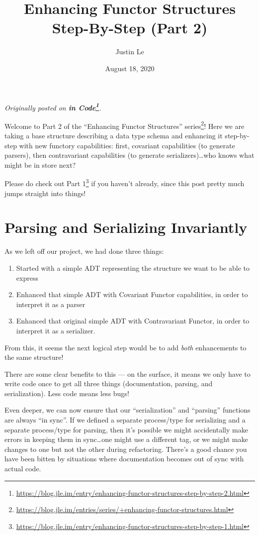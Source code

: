 \documentclass[]{article}
\title{Enhancing Functor Structures Step-By-Step (Part 2)}
\author{Justin Le}
\date{August 18, 2020}
\renewcommand{\href}[2]{#2\footnote{\url{#1}}}
\begin{document}
\maketitle

\emph{Originally posted on
\textbf{\href{https://blog.jle.im/entry/enhancing-functor-structures-step-by-step-2.html}{in
Code}}.}

Welcome to Part 2 of the
\href{https://blog.jle.im/entries/series/+enhancing-functor-structures.html}{``Enhancing
Functor Structures'' series}! Here we are taking a base structure describing a
data type schema and enhancing it step-by-step with new functory capabilities:
first, covariant capabilities (to generate parsers), then contravariant
capabilities (to generate serializers)\ldots who knows what might be in store
next?

Please do check out
\href{https://blog.jle.im/entry/enhancing-functor-structures-step-by-step-1.html}{Part
1} if you haven't already, since this post pretty much jumps straight into
things!

\hypertarget{parsing-and-serializing-invariantly}{%
\section{Parsing and Serializing
Invariantly}\label{parsing-and-serializing-invariantly}}

As we left off our project, we had done three things:

\begin{enumerate}
\def\labelenumi{\arabic{enumi}.}
\tightlist
\item
  Started with a simple ADT representing the structure we want to be able to
  express
\item
  Enhanced that simple ADT with Covariant Functor capabilities, in order to
  interpret it as a parser
\item
  Enhanced that original simple ADT with Contravariant Functor, in order to
  interpret it as a serializer.
\end{enumerate}

From this, it seems the next logical step would be to add \emph{both}
enhancements to the same structure!

There are some clear benefits to this --- on the surface, it means we only have
to write code once to get all three things (documentation, parsing, and
serialization). Less code means less bugs!

Even deeper, we can now ensure that our ``serialization'' and ``parsing''
functions are always ``in sync''. If we defined a separate process/type for
serializing and a separate process/type for parsing, then it's possible we might
accidentally make errors in keeping them in sync\ldots one might use a different
tag, or we might make changes to one but not the other during refactoring.
There's a good chance you have been bitten by situations where documentation
becomes out of sync with actual code.
\end{document}
